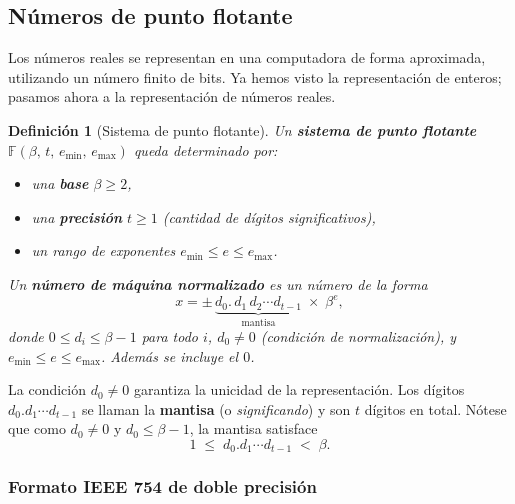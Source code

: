 \documentclass[a4paper,11pt]{report}
\newtheorem{definition}[theorem]{Definición}
\begin{document}
\subsection{Números de punto flotante}

Los números reales se representan en una computadora de forma aproximada, utilizando un número finito de bits.  Ya hemos visto la representación de enteros; pasamos ahora a la representación de números reales.

\begin{definition}[Sistema de punto flotante]
Un \textbf{sistema de punto flotante} $\mathbb{F}(\beta,\,t,\,e_{\min},\,e_{\max})$ queda determinado por:
\begin{itemize}
\item una \textbf{base} $\beta \geq 2$,
\item una \textbf{precisión} $t \geq 1$ (cantidad de dígitos significativos),
\item un rango de exponentes $e_{\min} \leq e \leq e_{\max}$.
\end{itemize}
Un \textbf{número de máquina normalizado} es un número de la forma
\[
x = \pm\, \underbrace{d_0.\,d_1\,d_2 \cdots d_{t-1}}_{\text{mantisa}} \;\times\; \beta^{e},
\]
donde $0 \le d_i \le \beta-1$ para todo $i$, $d_0 \neq 0$ (condición de normalización), y $e_{\min}\le e\le e_{\max}$.  Además se incluye el $0$.
\end{definition}

La condición $d_0\neq 0$ garantiza la unicidad de la representación. Los dígitos $d_0.d_1\cdots d_{t-1}$ se llaman la \textbf{mantisa} (o \textit{significando}) y son $t$ dígitos en total. Nótese que como $d_0\ne 0$ y $d_0\le\beta-1$, la mantisa satisface
\[
1 \;\le\; d_0.d_1\cdots d_{t-1} \;<\; \beta.
\]

\subsubsection*{Formato IEEE 754 de doble precisión}
\end{document}
